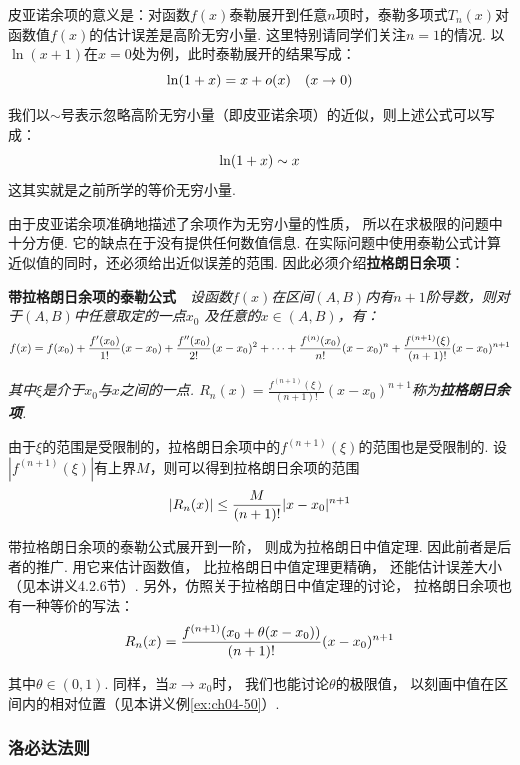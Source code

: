 皮亚诺余项的意义是：对函数$f(x)$泰勒展开到任意$n$项时，泰勒多项式$T_{n}(x)$对函数值$f(x)$的估计误差是高阶无穷小量.
这里特别请同学们关注$n=1$的情况. 以$\ln (x+1)$在$x=0$处为例，此时泰勒展开的结果写成：
$$
\setlength\abovedisplayskip{6pt}
\setlength\belowdisplayskip{6pt}
\ln (1+x) = x + o(x)~~~(x \to 0)
$$\par
我们以$\sim$号表示忽略高阶无穷小量（即皮亚诺余项）的近似，则上述公式可以写成：
$$
\setlength\abovedisplayskip{6pt}
    \setlength\belowdisplayskip{6pt}
\ln (1+x) \sim x
$$
这其实就是之前所学的等价无穷小量.

由于皮亚诺余项准确地描述了余项作为无穷小量的性质，
所以在求极限的问题中十分方便.
它的缺点在于没有提供任何数值信息. 在实际问题中使用泰勒公式计算近似值的同时，还必须给出近似误差的范围.
因此必须介绍\textbf{拉格朗日余项}：\par \vspace{1em}

\textbf{带拉格朗日余项的泰勒公式}~~\textit{设函数$f(x)$在区间$(A,B)$内有$n+1$阶导数，则对于$(A,B)$中任意取定的一点$x_0$
及任意的$x \in (A,B)$，有：}
$$
\setlength\abovedisplayskip{12pt}
\setlength\belowdisplayskip{12pt}
f(x) =  f(x_0) + \frac{f'(x_0)}{1!}(x-x_0) + \frac{f''(x_0)}{2!}(x-x_0)^2 + \cdots + \frac{f^{(n)}(x_0)}{n!}(x-x_0)^n
+ \frac{f^{(n+1)}(\xi)}{(n+1)!}(x-x_0)^{n+1}
$$

\textit{其中$\xi$是介于$x_0$与$x$之间的一点.
$R_n(x) = \frac{f^{(n+1)}(\xi)}{(n+1)!}(x-x_0)^{n+1}$称为\textbf{拉格朗日余项}.}\vspace{1em}

由于$\xi$的范围是受限制的，拉格朗日余项中的$f^{(n+1)}(\xi)$的范围也是受限制的.
设$\left| f^{(n+1)}(\xi) \right|$有上界$M$，则可以得到拉格朗日余项的范围
$$
\setlength\abovedisplayskip{12pt}
\setlength\belowdisplayskip{12pt}
|R_{n}(x)| \le \frac{M}{(n+1)!}|x-x_0|^{n+1}
$$\par
带拉格朗日余项的泰勒公式展开到一阶，
则成为拉格朗日中值定理.
因此前者是后者的推广.
用它来估计函数值，
比拉格朗日中值定理更精确，
还能估计误差大小（见本讲义4.2.6节）.
另外，仿照关于拉格朗日中值定理的讨论，
拉格朗日余项也有一种等价的写法：
$$
\setlength\abovedisplayskip{12pt}
\setlength\belowdisplayskip{12pt}
R_{n}(x) = \frac{f^{(n+1)}(x_0 + \theta(x - x_0))}{(n+1)!}(x-x_0)^{n+1}
$$\par
其中$\theta \in (0,1)$.
同样，当$x \to x_0$时，
我们也能讨论$\theta$的极限值，
以刻画中值在区间内的相对位置（见本讲义例\ref{ex:ch04-50}）.

\subsubsection{洛必达法则}

